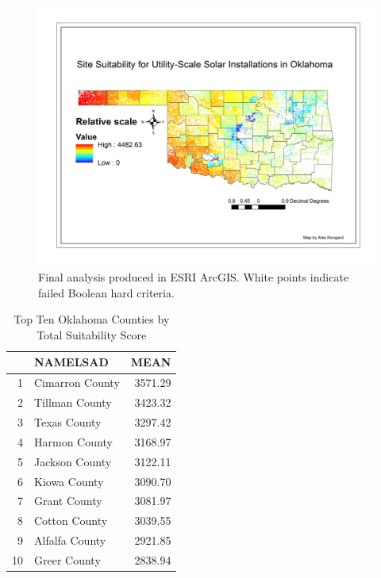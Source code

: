 \documentclass[12pt,english]{article}
\begin{document}



\begin{figure}[ht!]

\centering

\bigskip{}

\includegraphics[width=.9\linewidth]{finalproject.jpg}

\caption{Final analysis produced in ESRI ArcGIS. White points indicate failed Boolean hard criteria.}

\label{fig:fig6}

\end{figure}

\FloatBarrier




\begin{table}[bp!]
\caption{Top Ten Oklahoma Counties by Total Suitability Score}
\centering
\begin{tabular}{rlr}
  \hline
 & NAMELSAD & MEAN \\ 
  \hline
1 & Cimarron County & 3571.29 \\ 
  2 & Tillman County & 3423.32 \\ 
  3 & Texas County & 3297.42 \\ 
  4 & Harmon County & 3168.97 \\ 
  5 & Jackson County & 3122.11 \\ 
  6 & Kiowa County & 3090.70 \\ 
  7 & Grant County & 3081.97 \\ 
  8 & Cotton County & 3039.55 \\ 
  9 & Alfalfa County & 2921.85 \\ 
  10 & Greer County & 2838.94 \\ 
   \hline
\end{tabular}
\end{table}
\end{document}
